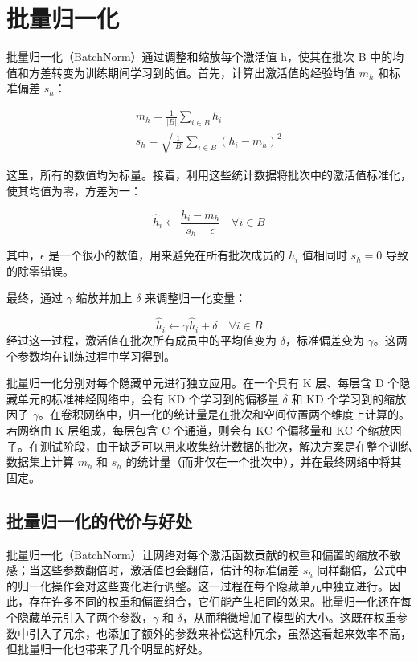 \section{批量归一化}
批量归一化（BatchNorm）通过调整和缩放每个激活值 h，使其在批次 B 中的均值和方差转变为训练期间学习到的值。首先，计算出激活值的经验均值 \(m_h\) 和标准偏差 \(s_h\)：

\begin{align}
m_h = \frac{1}{|B|} \sum_{i \in B} h_i \\
s_h = \sqrt{\frac{1}{|B|} \sum_{i \in B} (h_i - m_h)^2}
\end{align} 


这里，所有的数值均为标量。接着，利用这些统计数据将批次中的激活值标准化，使其均值为零，方差为一：

\[
\hat{h}_i \leftarrow \frac{h_i - m_h}{s_h + \epsilon} \quad \forall i \in B \tag{11.8}
\]

其中，\(\epsilon\) 是一个很小的数值，用来避免在所有批次成员的 \(h_i\) 值相同时 \(s_h = 0\) 导致的除零错误。

最终，通过 \(\gamma\) 缩放并加上 \(\delta\) 来调整归一化变量：

\[
\hat{h}_i \leftarrow \gamma\hat{h}_i + \delta \quad \forall i \in B \tag{11.9}
\]
经过这一过程，激活值在批次所有成员中的平均值变为 \(\delta\)，标准偏差变为 \(\gamma\)。这两个参数均在训练过程中学习得到。

批量归一化分别对每个隐藏单元进行独立应用。在一个具有 K 层、每层含 D 个隐藏单元的标准神经网络中，会有 KD 个学习到的偏移量 \(\delta\) 和 KD 个学习到的缩放因子 \(\gamma\)。在卷积网络中，归一化的统计量是在批次和空间位置两个维度上计算的。若网络由 K 层组成，每层包含 C 个通道，则会有 KC 个偏移量和 KC 个缩放因子。在测试阶段，由于缺乏可以用来收集统计数据的批次，解决方案是在整个训练数据集上计算 \(m_h\) 和 \(s_h\) 的统计量（而非仅在一个批次中），并在最终网络中将其固定。

\subsection{批量归一化的代价与好处}
批量归一化（BatchNorm）让网络对每个激活函数贡献的权重和偏置的缩放不敏感；当这些参数翻倍时，激活值也会翻倍，估计的标准偏差 \(s_h\) 同样翻倍，公式中的归一化操作会对这些变化进行调整。这一过程在每个隐藏单元中独立进行。因此，存在许多不同的权重和偏置组合，它们能产生相同的效果。批量归一化还在每个隐藏单元引入了两个参数，\(\gamma\) 和 \(\delta\)，从而稍微增加了模型的大小。这既在权重参数中引入了冗余，也添加了额外的参数来补偿这种冗余，虽然这看起来效率不高，但批量归一化也带来了几个明显的好处。

